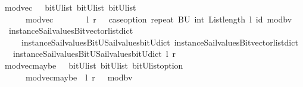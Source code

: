 \begin{isabellebody}
{}\isanewline
%
\isanewline
{}\isamarkupfalse%
\ mod{\isacharunderscore}vec\ \ {\isacharcolon}{\isacharcolon}\ {\isachardoublequoteopen}{\isacharparenleft}bitU{\isacharparenright}list\ {\isasymRightarrow}{\isacharparenleft}bitU{\isacharparenright}list\ {\isasymRightarrow}{\isacharparenleft}bitU{\isacharparenright}list\ {\isachardoublequoteclose}\ \ \ \isanewline
\ \ \ \ \ {\isachardoublequoteopen}\ mod{\isacharunderscore}vec\ \ \ \ \ \ \ \ l\ r\ {\isacharequal}\ {\isacharparenleft}\ case{\isacharunderscore}option\ {\isacharparenleft}repeat\ {\isacharbrackleft}BU{\isacharbrackright}\ {\isacharparenleft}int\ {\isacharparenleft}List{\isachardot}length\ l{\isacharparenright}{\isacharparenright}{\isacharparenright}\ id\ {\isacharparenleft}mod{\isacharunderscore}bv\ \isanewline
\ \ {\isacharparenleft}instance{\isacharunderscore}Sail{}{\isacharunderscore}values{\isacharunderscore}Bitvector{\isacharunderscore}list{\isacharunderscore}dict\isanewline
\ \ \ \ \ instance{\isacharunderscore}Sail{}{\isacharunderscore}values{\isacharunderscore}BitU{\isacharunderscore}Sail{}{\isacharunderscore}values{\isacharunderscore}bitU{\isacharunderscore}dict{\isacharparenright}\ {\isacharparenleft}instance{\isacharunderscore}Sail{}{\isacharunderscore}values{\isacharunderscore}Bitvector{\isacharunderscore}list{\isacharunderscore}dict\isanewline
\ \ \ instance{\isacharunderscore}Sail{}{\isacharunderscore}values{\isacharunderscore}BitU{\isacharunderscore}Sail{}{\isacharunderscore}values{\isacharunderscore}bitU{\isacharunderscore}dict{\isacharparenright}\ l\ r{\isacharparenright}{\isacharparenright}{\isachardoublequoteclose}\isanewline
\isanewline
{}\isamarkupfalse%
\ mod{\isacharunderscore}vec{\isacharunderscore}maybe\ \ {\isacharcolon}{\isacharcolon}\ {\isachardoublequoteopen}{\isacharparenleft}bitU{\isacharparenright}list\ {\isasymRightarrow}{\isacharparenleft}bitU{\isacharparenright}list\ {\isasymRightarrow}{\isacharparenleft}{\isacharparenleft}bitU{\isacharparenright}list{\isacharparenright}option\ {\isachardoublequoteclose}\ \ \ \isanewline
\ \ \ \ \ {\isachardoublequoteopen}\ mod{\isacharunderscore}vec{\isacharunderscore}maybe\ \ l\ r\ {\isacharequal}\ {\isacharparenleft}\ mod{\isacharunderscore}bv\ \isanewline

\end{isabellebody}
